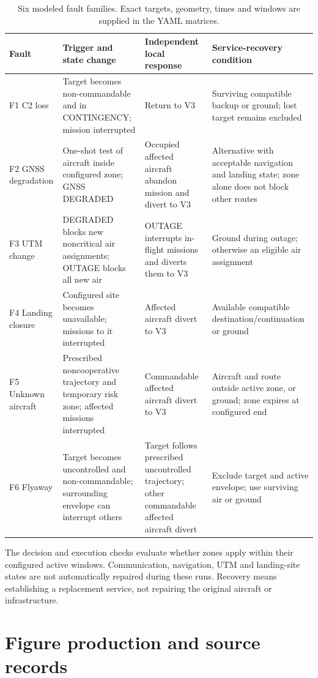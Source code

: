 \documentclass[11pt,a4paper]{article}
\begin{document}
\begin{table}[H]\centering\footnotesize
\caption{Six modeled fault families. Exact targets, geometry, times and windows are supplied in the YAML matrices.}\label{tab:S14}
\begin{tabularx}{\textwidth}{@{}lYYY@{}}\toprule
Fault & Trigger and state change & Independent local response & Service-recovery condition \\\midrule
F1 C2 loss & Target becomes non-commandable and in CONTINGENCY; mission interrupted & Return to V3 & Surviving compatible backup or ground; lost target remains excluded \\
F2 GNSS degradation & One-shot test of aircraft inside configured zone; GNSS DEGRADED & Occupied affected aircraft abandon mission and divert to V3 & Alternative with acceptable navigation and landing state; zone alone does not block other routes \\
F3 UTM change & DEGRADED blocks new noncritical air assignments; OUTAGE blocks all new air & OUTAGE interrupts in-flight missions and diverts them to V3 & Ground during outage; otherwise an eligible air assignment \\
F4 Landing closure & Configured site becomes unavailable; missions to it interrupted & Affected aircraft divert to V3 & Available compatible destination/continuation or ground \\
F5 Unknown aircraft & Prescribed noncooperative trajectory and temporary risk zone; affected missions interrupted & Commandable affected aircraft divert to V3 & Aircraft and route outside active zone, or ground; zone expires at configured end \\
F6 Flyaway & Target becomes uncontrolled and non-commandable; surrounding envelope can interrupt others & Target follows prescribed uncontrolled trajectory; other commandable affected aircraft divert & Exclude target and active envelope; use surviving air or ground \\\bottomrule
\end{tabularx}\end{table}

The decision and execution checks evaluate whether zones apply within their configured active windows. Communication, navigation, UTM and landing-site states are not automatically repaired during these runs. Recovery means establishing a replacement service, not repairing the original aircraft or infrastructure.

\section{Figure production and source records}
\end{document}
